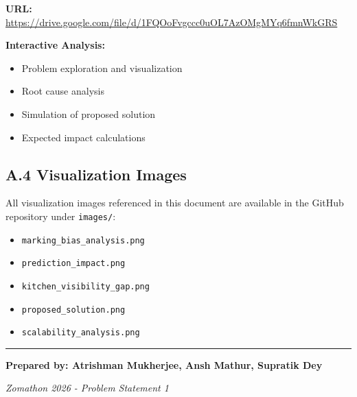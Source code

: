 \documentclass[11pt,a4paper]{article}
\begin{document}
\textbf{URL:} \url{https://drive.google.com/file/d/1FQOoFvgccc0uOL7AzOMgMYq6fmnWkGRS}

\textbf{Interactive Analysis:}
\begin{itemize}
    \item Problem exploration and visualization
    \item Root cause analysis
    \item Simulation of proposed solution
    \item Expected impact calculations
\end{itemize}

\subsection*{A.4 Visualization Images}

All visualization images referenced in this document are available in the GitHub repository under \texttt{images/}:

\begin{itemize}
    \item \texttt{marking\_bias\_analysis.png}
    \item \texttt{prediction\_impact.png}
    \item \texttt{kitchen\_visibility\_gap.png}
    \item \texttt{proposed\_solution.png}
    \item \texttt{scalability\_analysis.png}
\end{itemize}

\vspace{2cm}

\begin{center}
\rule{0.8\textwidth}{0.5pt}

\vspace{0.5cm}

\textbf{Prepared by: Atrishman Mukherjee, Ansh Mathur, Supratik Dey}

\textit{Zomathon 2026 - Problem Statement 1}

\end{center}
\end{document}
